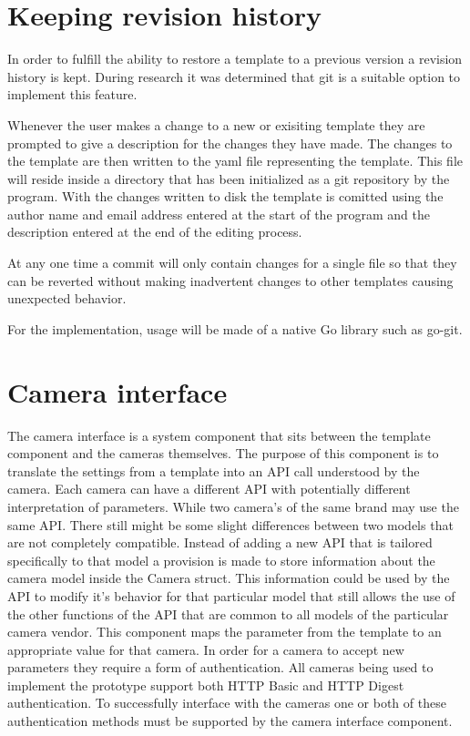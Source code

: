 \section{Keeping revision history}
In order to fulfill the ability to restore a template to a previous version a revision history is kept.
During research it was determined that git is a suitable option to implement this feature.

Whenever the user makes a change to a new or exisiting template they are prompted to give a description for the changes they have made.
The changes to the template are then written to the yaml file representing the template.
This file will reside inside a directory that has been initialized as a git repository by the program.
With the changes written to disk the template is comitted using the author name and email address entered at the start of the program and the description entered at the end of the editing process.

At any one time a commit will only contain changes for a single file so that they can be reverted without making inadvertent changes to other templates causing unexpected behavior.

For the implementation, usage will be made of a native Go library such as go-git.

\section{Camera interface}
The camera interface is a system component that sits between the template component and the cameras themselves. The purpose of this component
is to translate the settings from a template into an API call understood by the camera. Each camera can have a different API with potentially different interpretation of parameters.
While two camera's of the same brand may use the same API.
There still might be some slight differences between two models that are not completely compatible.
Instead of adding a new API that is tailored specifically to that model a provision is made to store information about the camera model inside the Camera struct.
This information could be used by the API to modify it's behavior for that particular model that still allows the use of the other functions of the API that are common to all models of the particular camera vendor.
This component maps the parameter from the template to an appropriate value for that camera.
In order for a camera to accept new parameters they require a form of authentication. All cameras being used to implement the prototype support both HTTP Basic and HTTP Digest authentication.
To successfully interface with the cameras one or both of these authentication methods must be supported by the camera interface component.

